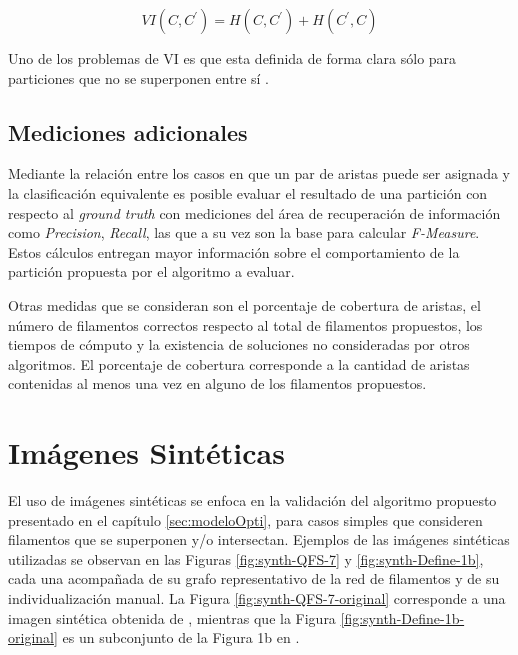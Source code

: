\begin{equation}
VI(C,C^{\prime}) = H(C,C^{\prime}) + H(C^{\prime},C)
\label{eq:VI}
\end{equation}

Uno de los problemas de VI es que esta definida de forma clara s\'olo para particiones que no se superponen entre s\'i \cite{breuer2015define}.

\subsection{Mediciones adicionales}

Mediante la relaci\'on entre los casos en que un par de aristas puede ser asignada y la clasificaci\'on equivalente es posible evaluar el resultado de una partici\'on con respecto al {\it ground truth} con mediciones del \'area de recuperaci\'on de informaci\'on como {\it Precision}, {\it Recall}, las que a su vez son la base para calcular {\it F-Measure}.
Estos c\'alculos entregan mayor informaci\'on sobre el comportamiento de la partici\'on propuesta por el algoritmo a evaluar. 


Otras medidas que se consideran son el porcentaje de cobertura de aristas, el n\'umero de filamentos correctos respecto al total de filamentos propuestos, los tiempos de c\'omputo y la existencia de soluciones no consideradas por otros algoritmos. El porcentaje de cobertura corresponde a la cantidad de aristas contenidas al menos una vez en alguno de los filamentos propuestos.

\section{Im\'agenes Sint\'eticas}
\label{sec:SynthImgMethod}
El uso de im\'agenes sint\'eticas se enfoca en la validaci\'on del algoritmo propuesto presentado en el cap\'itulo \ref{sec:modeloOpti}, para casos simples que consideren filamentos que se superponen y/o intersectan. Ejemplos de las im\'agenes sint\'eticas utilizadas se observan en las Figuras \ref{fig:synth-QFS-7} y \ref{fig:synth-Define-1b}, cada una acompa\~nada de su grafo representativo de la red de filamentos y de su individualizaci\'on manual. La Figura \ref{fig:synth-QFS-7-original} corresponde a una imagen sint\'etica obtenida de \cite{qiu2014quantitative}, mientras que la Figura \ref{fig:synth-Define-1b-original} es un subconjunto de la Figura 1b  en \cite{breuer2015define}. 

